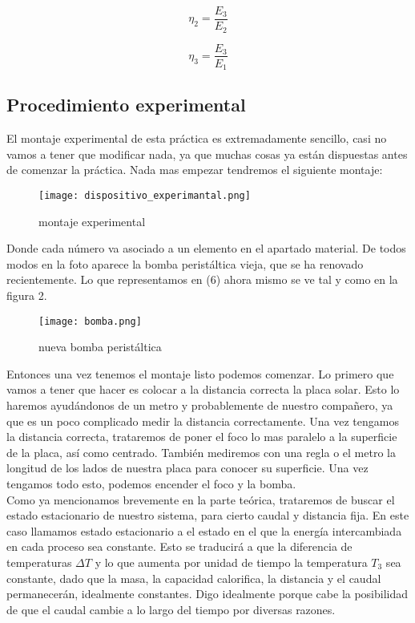 \documentclass[12pt,a4paper]{article}
\begin{document}
\begin{equation}
\eta_2 = \dfrac{E_3}{E_2}
\end{equation}

\begin{equation}
\eta_3 = \dfrac{E_3}{E_1}
\end{equation}

\subsection{Procedimiento experimental}

El montaje experimental de esta práctica es extremadamente sencillo, casi no vamos a tener que modificar nada, ya que muchas cosas ya están dispuestas antes de comenzar la práctica. Nada mas empezar tendremos el siguiente montaje:

\begin{figure}[h!] \centering
\texttt{[image: dispositivo\_experimantal.png]}
\caption{montaje experimental}
\end{figure}

Donde cada número va asociado a un elemento en el apartado material. De todos modos en la foto aparece la bomba peristáltica vieja, que se ha renovado recientemente. Lo que representamos en (6) ahora mismo se ve tal y como en la figura 2. \\

\begin{figure}[h!] \centering
\texttt{[image: bomba.png]}
\label{Fig:1}
\caption{nueva bomba peristáltica}
\end{figure}

Entonces una vez tenemos el montaje listo podemos comenzar. Lo primero que vamos a tener que hacer es colocar a la distancia correcta la placa solar. Esto lo haremos ayudándonos de un metro y probablemente de nuestro compañero, ya que es un poco complicado medir la distancia correctamente. Una vez tengamos la distancia correcta, trataremos de poner el foco lo mas paralelo a la superficie de la placa, así como centrado. También mediremos con una regla o el metro la longitud de los lados de nuestra placa para conocer su superficie. Una vez tengamos todo esto, podemos encender el foco y la bomba. \\

Como ya mencionamos brevemente en la parte teórica, trataremos de buscar el estado estacionario de nuestro sistema, para cierto caudal y distancia fija. En este caso llamamos estado estacionario a el estado en el que la energía intercambiada en cada proceso sea constante. Esto se traducirá a que la diferencia de temperaturas $\Delta T$ y lo que aumenta por unidad de tiempo la temperatura $T_3$ sea constante, dado que la masa, la capacidad calorifica, la distancia y el caudal permanecerán, idealmente constantes. Digo idealmente porque cabe la posibilidad de que el caudal cambie a lo largo del tiempo por diversas razones. \\
\end{document}
